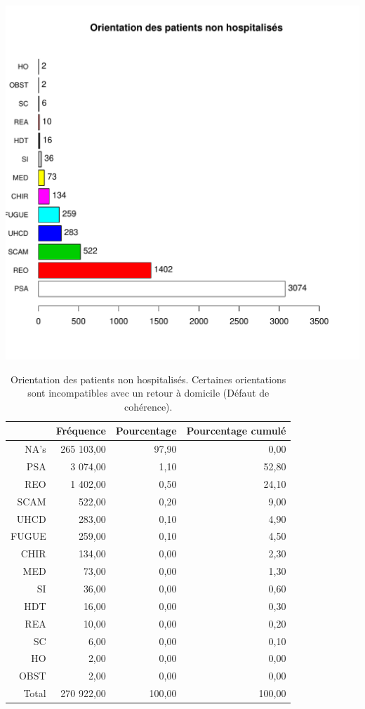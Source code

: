 \documentclass[12pt,english,french,twoside]{book}\usepackage[]{graphicx}\usepackage[]{color}
\makeatletter
\def\maxwidth{ %
  \ifdim\Gin@nat@width>\linewidth
    \linewidth
  \else
    \Gin@nat@width
  \fi
}
\makeatother
\begin{document}
\includegraphics[width=\maxwidth]{figure/fausses_sorties} 
\begin{table}[ht]
\centering
\begin{tabular}{rrrr}
  \hline
 & Fréquence & Pourcentage & Pourcentage cumulé \\ 
  \hline
NA's & 265 103,00 & 97,90 & 0,00 \\ 
  PSA & 3 074,00 & 1,10 & 52,80 \\ 
  REO & 1 402,00 & 0,50 & 24,10 \\ 
  SCAM & 522,00 & 0,20 & 9,00 \\ 
  UHCD & 283,00 & 0,10 & 4,90 \\ 
  FUGUE & 259,00 & 0,10 & 4,50 \\ 
  CHIR & 134,00 & 0,00 & 2,30 \\ 
  MED & 73,00 & 0,00 & 1,30 \\ 
  SI & 36,00 & 0,00 & 0,60 \\ 
  HDT & 16,00 & 0,00 & 0,30 \\ 
  REA & 10,00 & 0,00 & 0,20 \\ 
  SC & 6,00 & 0,00 & 0,10 \\ 
  HO & 2,00 & 0,00 & 0,00 \\ 
  OBST & 2,00 & 0,00 & 0,00 \\ 
    Total & 270 922,00 & 100,00 & 100,00 \\ 
   \hline
\end{tabular}
\caption[Orientation des patients non hospitalisés]{Orientation des patients non hospitalisés. Certaines orientations sont incompatibles avec un retour à domicile (Défaut de cohérence).} 
\label{tab:orient_nh}
\end{table}
\end{document}
